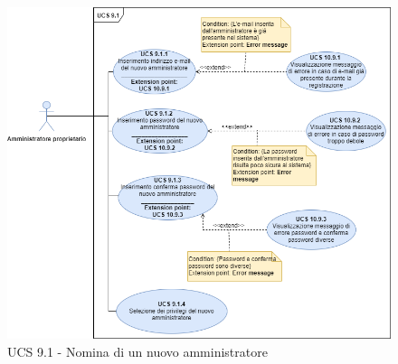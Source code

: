 \begin{figure}[h!]
  \centering
    \includegraphics[scale=0.5]{Sezioni/UseCase/Immagini/UCS9.1.png}
  \caption{UCS 9.1 - Nomina di un nuovo amministratore}
\end{figure}

